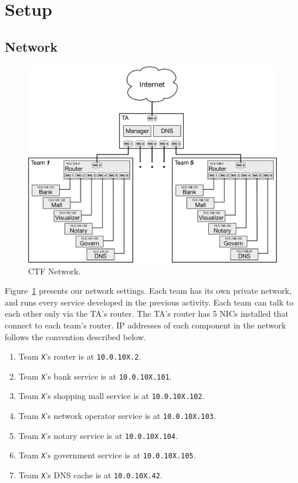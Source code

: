 \documentclass[a4paper, 11pt]{article}
\theoremstyle{definition}
\begin{document}
{\section{Setup}

\subsection{Network}

\begin{figure}[t]
  \centering
  \includegraphics[width=\linewidth]{figs/network}
  \caption{CTF Network.}
  \label{fig:net}
\end{figure}

Figure~\ref{fig:net} presents our network settings. Each team has its
own private network, and runs every service developed in the previous
activity. Each team can talk to each other only via the TA's router.
The TA's router has 5 NICs installed that connect to each team's
router. IP addresses of each component in the network follows the
convention described below.

\begin{enumerate}
%
  \item Team \texttt{X}'s router is at \texttt{10.0.10X.2}.
%
  \item Team \texttt{X}'s bank service is at \texttt{10.0.10X.101}.
%
  \item Team \texttt{X}'s shopping mall service is at
    \texttt{10.0.10X.102}.
%
  \item Team \texttt{X}'s network operator service is at
    \texttt{10.0.10X.103}.
%
  \item Team \texttt{X}'s notary service is at \texttt{10.0.10X.104}.
%
  \item Team \texttt{X}'s government service is at \texttt{10.0.10X.105}.
%
  \item Team \texttt{X}'s DNS cache is at \texttt{10.0.10X.42}.
%
\end{enumerate}

}
\end{document}
